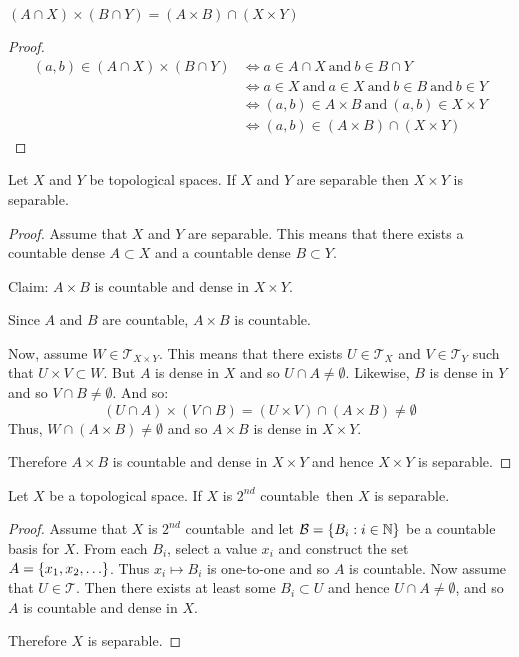 \documentclass[letterpaper,12pt,fleqn]{article}
\newcommand{\T}{\mathscr{T}}
\newcommand{\B}{\mathcal{B}}
\renewcommand{\sc}{\(2^{nd}\) countable}
\begin{document}
\begin{lemma}
  \((A\cap X)\times(B\cap Y)=(A\times B)\cap(X\times Y)\)
\end{lemma}

\begin{proof}
  \begin{align*}
    (a,b)\in(A\cap X)\times(B\cap Y) &\iff a\in A\cap X\ \text{and}\ b\in B\cap Y \\
    &\iff a\in X\ \text{and}\ a\in X\ \text{and}\ b\in B\ \text{and}\ b\in Y \\
    &\iff (a,b)\in A\times B\ \text{and}\ (a,b)\in X\times Y \\
    &\iff (a,b)\in (A\times B)\cap(X\times Y)
  \end{align*}
\end{proof}

\begin{theorem}[5.5]
  Let \(X\) and \(Y\) be topological spaces.  If \(X\) and \(Y\) are separable then \(X\times Y\) is separable.
\end{theorem}

\begin{proof}
  Assume that \(X\) and \(Y\) are separable.  This means that there exists a countable dense \(A\subset X\) and a
  countable dense \(B\subset Y\).

  Claim: \(A\times B\) is countable and dense in \(X\times Y\).

  Since \(A\) and \(B\) are countable, \(A\times B\) is countable.

  Now, assume \(W\in\T_{X\times Y}\).  This means that there exists \(U\in\T_X\) and \(V\in\T_Y\) such that
  \(U\times V\subset W\).  But \(A\) is dense in \(X\) and so \(U\cap A\ne\emptyset\).  Likewise, \(B\) is dense in
  \(Y\) and so \(V\cap B\ne\emptyset\).  And so:
  \[(U\cap A)\times(V\cap B)=(U\times V)\cap(A\times B)\ne\emptyset\]
  Thus, \(W\cap (A\times B)\ne\emptyset\) and so \(A\times B\) is dense in \(X\times Y\).

  Therefore \(A\times B\) is countable and dense in \(X\times Y\) and hence \(X\times Y\) is separable.
\end{proof}

\begin{theorem}[5.9]
  Let \(X\) be a topological space.  If \(X\) is \sc\ then \(X\) is separable.
\end{theorem}

\begin{proof}
  Assume that \(X\) is \sc\ and let \(\B=\set{B_i:i\in\N}\) be a countable basis for \(X\).  From each \(B_i\),
  select a value \(x_i\) and construct the set \(A=\{x_1,x_2,\ldots\}\).  Thus \(x_i\mapsto B_i\) is one-to-one
  and so \(A\) is countable.  Now assume that \(U\in\T\).  Then there exists at least some \(B_i\subset U\) and
  hence \(U\cap A\ne\emptyset\), and so \(A\) is countable and dense in \(X\).

  Therefore \(X\) is separable.
\end{proof}
\end{document}
